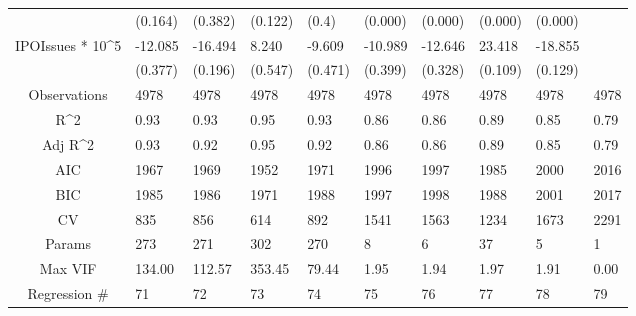 \documentclass{article}
\begin{document}
\begin{table}[H]
\begin{tabular}{|clllllllll|}
   & (0.164) & (0.382) & (0.122) & (0.4) & (0.000) & (0.000) & (0.000) & (0.000) &  \\ 
  IPOIssues * 10^5 & -12.085 & -16.494 & 8.240 & -9.609 & -10.989 & -12.646 & 23.418 & -18.855 &  \\ 
   & (0.377) & (0.196) & (0.547) & (0.471) & (0.399) & (0.328) & (0.109) & (0.129) &  \\ 
  \hline 
 Observations & 4978 & 4978 & 4978 & 4978 & 4978 & 4978 & 4978 & 4978 & 4978 \\ 
  R^2 & 0.93 & 0.93 & 0.95 & 0.93 & 0.86 & 0.86 & 0.89 & 0.85 & 0.79 \\ 
  Adj R^2 & 0.93 & 0.92 & 0.95 & 0.92 & 0.86 & 0.86 & 0.89 & 0.85 & 0.79 \\ 
  AIC & 1967 & 1969 & 1952 & 1971 & 1996 & 1997 & 1985 & 2000 & 2016 \\ 
  BIC & 1985 & 1986 & 1971 & 1988 & 1997 & 1998 & 1988 & 2001 & 2017 \\ 
  CV & 835 & 856 & 614 & 892 & 1541 & 1563 & 1234 & 1673 & 2291 \\ 
  Params & 273 & 271 & 302 & 270 & 8 & 6 & 37 & 5 & 1 \\ 
  Max VIF & 134.00 & 112.57 & 353.45 & 79.44 & 1.95 & 1.94 & 1.97 & 1.91 & 0.00 \\ 
  Regression \# & 71 & 72 & 73 & 74 & 75 & 76 & 77 & 78 & 79 \\ 
   \hline
\end{tabular}
 
\end{table}
\end{document}
